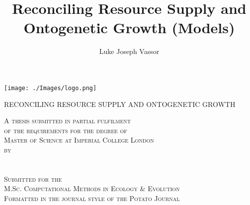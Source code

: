 \documentclass[a4paper]{article} %
\title{Reconciling Resource Supply and Ontogenetic Growth (Models)}
\author{Luke Joseph Vassor}
\begin{document}
\begin{titlepage}
    
    \texttt{[image: ./Images/logo.png]}\\%
     
    
    \center %
    
    
    \makeatletter
    \linespread{1.5} %
        {\huge{RECONCILING RESOURCE SUPPLY AND ONTOGENETIC GROWTH}\par} %
    \vspace{2.5cm} %

    \textsc{A thesis submitted in partial fulfilment \\ of the requirements for the degree of \\ Master of Science at Imperial College London \\ by \\ \ }\\[2.5cm]
    \textsc{\Large \@author}\\[2.5cm]
    \textsc{Submitted for the \\ M.Sc. Computational Methods in Ecology \& Evolution \\ Formatted in the journal style of the Potato Journal \\ \ }\\[2cm]


\end{titlepage}
\end{document}
